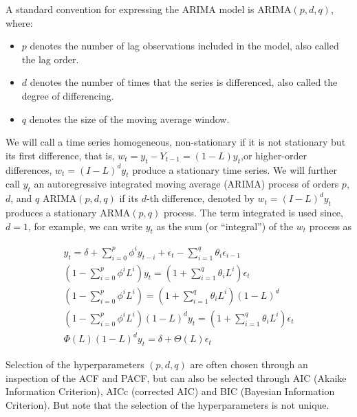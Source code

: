 \documentclass[
  11pt,
]{article}
\begin{document}
A standard convention for expressing the ARIMA model is
\(\mathrm{ARIMA}(p, d, q)\), where:

\begin{itemize}
\item
  \(p\) denotes the number of lag observations included in the model,
  also called the lag order.
\item
  \(d\) denotes the number of times that the series is differenced, also
  called the degree of differencing.
\item
  \(q\) denotes the size of the moving average window.
\end{itemize}

We will call a time series homogeneous, non-stationary if it is not
stationary but its first difference, that is,
\(w_{t} = y_{t} - Y_{t-1} =(1 - L)y_{t}\),or higher-order differences,
\(w_{t} =(I- L)^{d}y_{t}\) produce a stationary time series. We will
further call \(y_{t}\) an autoregressive integrated moving average
(\(\mathrm{ARIMA}\)) process of orders \(p\), \(d\), and \(q\)
\(\mathrm{ARIMA}(p, d, q)\) if its \(d\)-th difference, denoted by
\(w_{t} =(I- L)^{d}y_{t}\) produces a stationary \(\mathrm{ARMA}(p, q)\)
process. The term integrated is used since, \(d = 1\), for example, we
can write \(y_{t}\) as the sum (or ``integral'') of the \(w_{t}\)
process as

\begin{gather*}
y_{t} = \delta + \sum\limits_{i=0}^{p}\phi^{i}y_{t- i} + \epsilon_{t} - \sum\limits_{i=1}^{q}\theta_{i}\epsilon_{i-1} \\[8pt]
\left(1 - \sum\limits_{i=0}^{p}\phi^{i}L^{i}\right)y_{t} = \left(1 + \sum\limits_{i=1}^{q}\theta_{i}L^{i}\right)\epsilon_{t} \\[8pt]
\left(1 - \sum\limits_{i=0}^{p}\phi^{i}L^{i}\right) = \left(1 + \sum\limits_{i=1}^{q}\theta_{i}L^{i}\right)\left(1 - L\right)^{d} \\[8pt]
\left(1 - \sum\limits_{i=0}^{p}\phi^{i}L^{i}\right)\left(1 - L\right)^{d}y_{t} = \left(1 + \sum\limits_{i=1}^{q}\theta_{i}L^{i}\right)\epsilon_{t} \\[8pt]
\Phi(L)(1 - L)^{d}y_{t} = \delta + \Theta(L)\epsilon_{t}
\end{gather*}

Selection of the hyperparameters \((p, d, q)\) are often chosen through
an inspection of the ACF and PACF, but can also be selected through AIC
(Akaike Information Criterion), AICc (corrected AIC) and BIC (Bayesian
Information Criterion). But note that the selection of the
hyperparameters is not unique.
\end{document}
